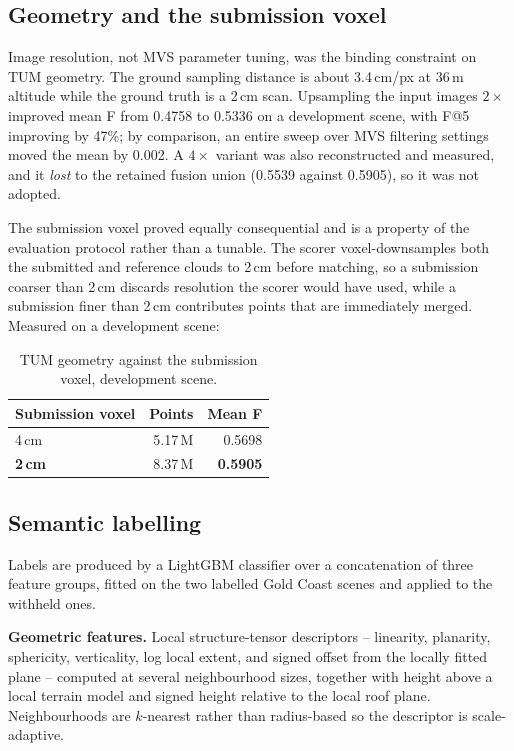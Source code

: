 \documentclass[10pt,twocolumn,letterpaper]{article}
\begin{document}
\subsection{Geometry and the submission voxel}

Image resolution, not MVS parameter tuning, was the binding constraint on TUM
geometry. The ground sampling distance is about 3.4\,cm/px at 36\,m altitude
while the ground truth is a 2\,cm scan. Upsampling the input images $2\times$
improved mean F from 0.4758 to 0.5336 on a development scene, with F@5 improving
by 47\%; by comparison, an entire sweep over MVS filtering settings moved the
mean by 0.002. A $4\times$ variant was also reconstructed and measured, and it
\emph{lost} to the retained fusion union (0.5539 against 0.5905), so it was not
adopted.

The submission voxel proved equally consequential and is a property of the
evaluation protocol rather than a tunable. The scorer voxel-downsamples both the
submitted and reference clouds to 2\,cm before matching, so a submission coarser
than 2\,cm discards resolution the scorer would have used, while a submission
finer than 2\,cm contributes points that are immediately merged. Measured on a
development scene:

\begin{table}[h]
\centering
\begin{tabular}{@{}lrr@{}}
\toprule
Submission voxel & Points & Mean F \\
\midrule
4\,cm & 5.17\,M & 0.5698 \\
\textbf{2\,cm} & 8.37\,M & \textbf{0.5905} \\
\bottomrule
\end{tabular}
\caption{TUM geometry against the submission voxel, development scene.}
\end{table}

\subsection{Semantic labelling}

Labels are produced by a LightGBM classifier over a concatenation of three
feature groups, fitted on the two labelled Gold Coast scenes and applied to the
withheld ones.

\textbf{Geometric features.} Local structure-tensor descriptors -- linearity,
planarity, sphericity, verticality, log local extent, and signed offset from the
locally fitted plane -- computed at several neighbourhood sizes, together with
height above a local terrain model and signed height relative to the local roof
plane. Neighbourhoods are $k$-nearest rather than radius-based so the descriptor
is scale-adaptive.
\end{document}
